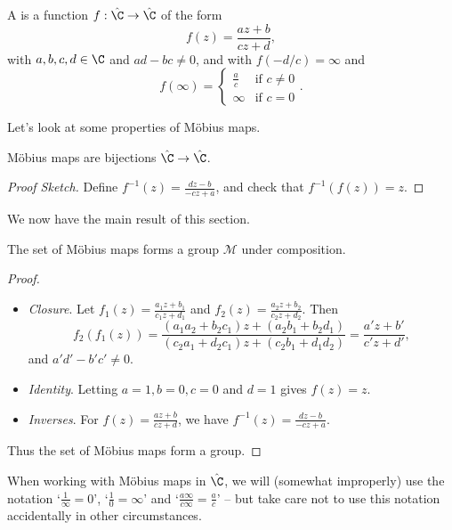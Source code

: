 \begin{definition}
	A  is a function $f : \hat{\C} \rightarrow \hat{\C}$ of the form
	$$
	f(z) = \frac{az + b}{cz + d},
	$$
	with $a, b, c, d \in \C$ and $ad - bc \neq 0$, and with $f(-d/c) = \infty$ and 
	$$
	f(\infty) = \begin{cases}
	   \frac{a}{c} &\mbox{if } c \neq 0 \\
	   \infty &\mbox{if } c = 0
	   \end{cases}.
	$$
\end{definition}

Let's look at some properties of Möbius maps.

\begin{proposition}
	Möbius maps are bijections $\hat{\C} \rightarrow \hat{\C}$.
\end{proposition}
\begin{proof}[Proof Sketch]
	Define $f^{-1}(z) = \frac{dz - b}{-cz + a}$, and check that $f^{-1}(f(z)) = z$.
\end{proof}

We now have the main result of this section.

\begin{theorem}
	The set of Möbius maps forms a group $\mathcal{M}$ under composition.
\end{theorem}
\begin{proof}$ $
	\begin{itemize}
		\item \emph{Closure}. Let $f_1(z) = \frac{a_1 z + b_1}{c_1 z + d_1}$ and $f_2(z) = \frac{a_2 z + b_2}{c_2 z + d_2}$. Then
		$$
		f_2(f_1(z)) = \frac{(a_1 a_2 + b_2 c_1)z + (a_2 b_1 + b_2 d_1)}{(c_2 a_1 + d_2 c_1)z + (c_2 b_1+ d_1 d_2)} = \frac{a' z + b'}{c' z + d'},
		$$
		and $a' d' - b' c' \neq 0$.
		\item \emph{Identity}. Letting $a = 1, b = 0, c = 0$ and $d = 1$ gives $f(z) = z$.
		\item \emph{Inverses}. For $f(z) = \frac{az + b}{cz + d}$, we have $f^{-1}(z) = \frac{dz - b}{-cz + a}$. 
	\end{itemize}
	Thus the set of Möbius maps form a group.
\end{proof}

\begin{remark}
	When working with Möbius maps in $\hat{\C}$, we will (somewhat improperly) use the notation `$\frac{1}{\infty} = 0$', `$\frac{1}{0} = \infty$' and `$\frac{a\infty}{c \infty} = \frac{a}{c}$' -- but take care not to use this notation accidentally in other circumstances.
\end{remark}


